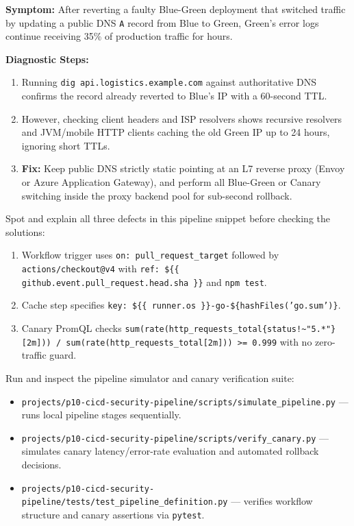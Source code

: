 \begin{realworldbox}
\textbf{Symptom:} After reverting a faulty Blue-Green deployment that switched traffic by updating a public DNS \texttt{A} record from Blue to Green, Green's error logs continue receiving 35\% of production traffic for hours.

\textbf{Diagnostic Steps:}
\begin{enumerate}[leftmargin=12pt]
  \item Running \texttt{dig api.logistics.example.com} against authoritative DNS confirms the record already reverted to Blue's IP with a 60-second TTL.
  \item However, checking client headers and ISP resolvers shows recursive resolvers and JVM/mobile HTTP clients caching the old Green IP up to 24 hours, ignoring short TTLs.
  \item \textbf{Fix:} Keep public DNS strictly static pointing at an L7 reverse proxy (Envoy or Azure Application Gateway), and perform all Blue-Green or Canary switching inside the proxy backend pool for sub-second rollback.
\end{enumerate}
\end{realworldbox}

\begin{tryityourselfbox}
Spot and explain all three defects in this pipeline snippet before checking the solutions:
\begin{enumerate}[leftmargin=12pt]
  \item Workflow trigger uses \texttt{on: pull\_request\_target} followed by \texttt{actions/checkout@v4} with \texttt{ref: \$\{\{ github.event.pull\_request.head.sha \}\}} and \texttt{npm test}.
  \item Cache step specifies \texttt{key: \$\{\{ runner.os \}\}-go-\$\{hashFiles('go.sum')\}}.
  \item Canary PromQL checks \texttt{sum(rate(http\_requests\_total\{status!\textasciitilde{}"5.*"\}[2m])) / sum(rate(http\_requests\_total[2m])) >= 0.999} with no zero-traffic guard.
\end{enumerate}
\end{tryityourselfbox}

\begin{labbridgebox}
Run and inspect the pipeline simulator and canary verification suite:
\begin{itemize}[leftmargin=12pt]
  \item \texttt{projects/p10-cicd-security-pipeline/scripts/simulate\_pipeline.py} --- runs local pipeline stages sequentially.
  \item \texttt{projects/p10-cicd-security-pipeline/scripts/verify\_canary.py} --- simulates canary latency/error-rate evaluation and automated rollback decisions.
  \item \texttt{projects/p10-cicd-security-pipeline/tests/test\_pipeline\_definition.py} --- verifies workflow structure and canary assertions via \texttt{pytest}.
\end{itemize}
\end{labbridgebox}

